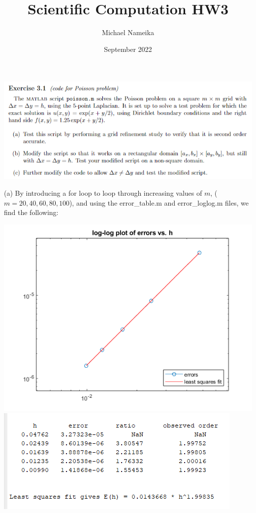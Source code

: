\documentclass{article}
\title{Scientific Computation HW3}
\author{Michael Nameika}
\date{September 2022}
\begin{document}
\maketitle

\includegraphics[scale = 0.8]{ex3.1.PNG}

(a) By introducing a for loop to loop through increasing values of $m$, ($m = 20, 40, 60, 80, 100$), and using the error\_table.m and error\_loglog.m files, we find the following:

\includegraphics[scale = 0.5]{loglog_error_poisson.png}
\includegraphics[scale = 0.7]{error_table_poisson.PNG}
\end{document}
